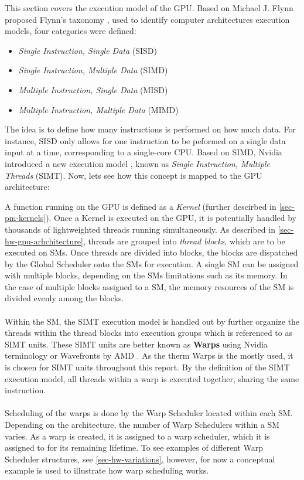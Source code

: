 
This section covers the execution model of the GPU.
Based on Michael J. Flynn proposed Flynn's taxonomy \cite{Flynn1972}, used to identify computer architectures execution models, four categories were defined:

\begin{itemize}
	\item \textit{Single Instruction, Single Data} (SISD)
	\item \textit{Single Instruction, Multiple Data} (SIMD)
	\item \textit{Multiple Instruction, Single Data} (MISD)
	\item \textit{Multiple Instruction, Multiple Data} (MIMD)
\end{itemize}

The idea is to define how many instructions is performed on how much data.
For instance, SISD only allows for one instruction to be peformed on a single data input at a time, corresponding to a single-core CPU.
Based on SIMD, Nvidia introduced a new execution model \cite{Nvidia2009}, known as \textit{Single Instruction, Multiple Threads} (SIMT).
Now, lets see how this concept is mapped to the GPU architecture:


A function running on the GPU is defined as a \textit{Kernel} (further descirbed in \cref{sec-pm-kernels}).
Once a Kernel is executed on the GPU, it is potentially handled by thousands of lightweighted threads running simultaneously.
As described in \cref{sec-hw-gpu-arhchitecture}, threads are grouped into \textit{thread blocks}, which are to be executed on SMs.
Once threads are divided into blocks, the blocks are dispatched by the Global Scheduler onto the SMs for execution.
A single SM can be assigned with multiple blocks, depending on the SMs limitations such as its memory.
In the case of multiple blocks assigned to a SM, the memory resources of the SM is divided evenly among the blocks.
\\\\
Within the SM, the SIMT execution model is handled out by further organize the threads within the thread blocks into execution groups which is referenced to as SIMT units.
These SIMT units are better known as \textbf{Warps} using Nvidia terminology \cite{Nvidia2009} or Wavefronts by AMD \cite{Johansson2010}.
As the therm Warps is the mostly used, it is chosen for SIMT units throughout this report.
By the definition of the SIMT execution model, all threads within a warp is executed together, sharing the same instruction.
\\\\
Scheduling of the warps is done by the Warp  Scheduler located within each SM.
Depending on the architecture, the number of Warp Schedulers within a SM varies.
As a warp is created, it is assigned to a warp scheduler, which it is assigned to for its remaining lifetime.
To see examples of different Warp Scheduler structures, see \cref{sec-hw-variations}, however, for now a conceptual example is used to illustrate how warp scheduling works.

